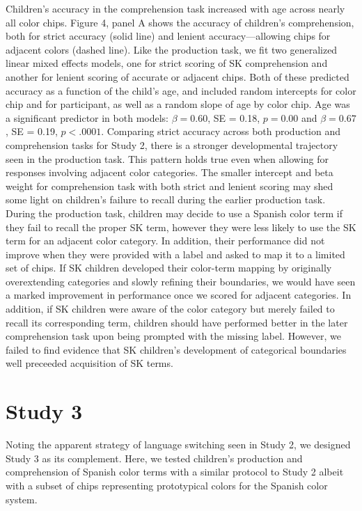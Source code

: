 \documentclass[
  english,
  ,man,floatsintext]{apa6}
\begin{document}
Children's accuracy in the comprehension task increased with age across nearly all color chips. Figure 4, panel A shows the accuracy of children's comprehension, both for strict accuracy (solid line) and lenient accuracy---allowing chips for adjacent colors (dashed line). Like the production task, we fit two generalized linear mixed effects models, one for strict scoring of SK comprehension and another for lenient scoring of accurate or adjacent chips. Both of these predicted accuracy as a function of the child's age, and included random intercepts for color chip and for participant, as well as a random slope of age by color chip. Age was a significant predictor in both models: \(\beta = 0.60\), SE = 0.18, \(p = 0.00\) and \(\beta = 0.67\), SE = 0.19, \(p < .0001\).
Comparing strict accuracy across both production and comprehension tasks for Study 2, there is a stronger developmental trajectory seen in the production task. This pattern holds true even when allowing for responses involving adjacent color categories. The smaller intercept and beta weight for comprehension task with both strict and lenient scoring may shed some light on children's failure to recall during the earlier production task. During the production task, children may decide to use a Spanish color term if they fail to recall the proper SK term, however they were less likely to use the SK term for an adjacent color category. In addition, their performance did not improve when they were provided with a label and asked to map it to a limited set of chips. If SK children developed their color-term mapping by originally overextending categories and slowly refining their boundaries, we would have seen a marked improvement in performance once we scored for adjacent categories. In addition, if SK children were aware of the color category but merely failed to recall its corresponding term, children should have performed better in the later comprehension task upon being prompted with the missing label. However, we failed to find evidence that SK children's development of categorical boundaries well preceeded acquisition of SK terms.

\hypertarget{study-3}{%
\section{Study 3}\label{study-3}}

Noting the apparent strategy of language switching seen in Study 2, we designed Study 3 as its complement. Here, we tested children's production and comprehension of Spanish color terms with a similar protocol to Study 2 albeit with a subset of chips representing prototypical colors for the Spanish color system.
\end{document}
